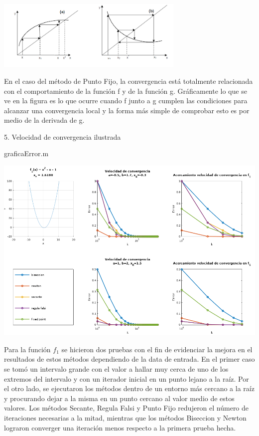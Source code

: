 \documentclass[11pt]{article}
\begin{document}
\begin{center}
    \includegraphics[keepaspectratio, width=9cm]{Di.png}
    \caption{\\}
\end{center}  
En el caso del método de Punto Fijo, la convergencia está totalmente relacionada con el comportamiento de la función f y de la función g. Gráficamente lo que se ve en la figura es lo que ocurre cuando f junto a g cumplen las condiciones para alcanzar una convergencia local y la forma más simple de comprobar esto es por medio de la derivada de g.
\vspace{1cm}
\begin{center} \Large {5. Velocidad de convergencia ilustrada} \end{center}
\begin{tcolorbox}[colframe=blue!35!black, title=Código]
    graficaError.m
\end{tcolorbox}
\includegraphics[keepaspectratio, width=15cm]{Error1.png}
\caption{\\}
Para la función $f_1$ se hicieron dos pruebas con el fin de evidenciar la mejora en el resultados de estos métodos dependiendo de la data de entrada. En el primer caso se tomó un intervalo grande con el valor a hallar muy cerca de uno de los extremos del intervalo y con un iterador inicial en un punto lejano a la raíz. Por el otro lado, se ejecutaron los métodos dentro de un entorno más cercano a la raíz y procurando dejar a la misma en un punto cercano al valor medio de estos valores. Los métodos Secante, Regula Falsi y Punto Fijo redujeron el número de iteraciones necesarias a la mitad, mientras que los métodos Biseccion y Newton lograron converger una iteración menos respecto a la primera prueba hecha.
\end{document}
